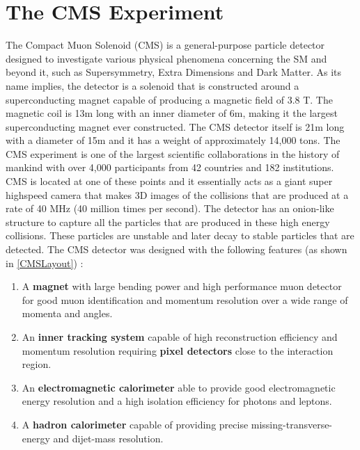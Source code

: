 \chapter{The CMS Experiment\label{ch:CMS}}

The Compact Muon Solenoid (CMS) is a general-purpose particle detector designed to investigate various physical phenomena concerning the SM and beyond it, such as Supersymmetry,
 Extra Dimensions and Dark Matter. As its name implies, the detector is a solenoid that is constructed around a superconducting magnet capable of producing a magnetic field of 3.8 T. The magnetic coil is 13m long with an inner diameter of 6m, making it the largest superconducting magnet ever constructed. The CMS detector itself is 21m long with a diameter of 15m and it has a weight of approximately 14,000 tons. The CMS experiment is one of the largest scientific collaborations in the history of mankind with over 4,000 participants from 42 countries and 182 institutions. CMS is located at one of these points and it essentially acts as a giant super highspeed camera that makes 3D images of the collisions that are produced at a rate of 40 MHz (40 million times per second). The detector has an onion-like structure to capture all the particles that are produced in these high energy collisions. These particles are unstable and later decay to stable particles that are detected.  The CMS detector was designed with the following features (as shown in \autoref{CMSLayout}) :

\begin{enumerate}
	\item{A \textbf{magnet} with large bending power and high performance muon detector for good muon
identification and momentum resolution over a wide range of momenta and angles.}

	\item{An \textbf{inner tracking system} capable of high reconstruction efficiency and momentum resolution
requiring \textbf{pixel detectors} close to the interaction region.}

	\item{An \textbf{electromagnetic calorimeter} able to provide good electromagnetic energy resolution and  
a high isolation efficiency for photons and leptons.}

	\item{A \textbf{hadron calorimeter} capable of providing precise missing-transverse-energy and dijet-mass  
resolution.}

\end{enumerate}

